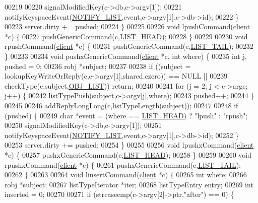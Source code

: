\begin{DoxyCode}
00219 
00220         signalModifiedKey(c->db,c->argv[1]);
00221         notifyKeyspaceEvent(\hyperlink{server_8h_a1c0b64c84b0e66dff3554ffe3e2ec4c8}{NOTIFY\_LIST},event,c->argv[1],c->db->id);
00222     \}
00223     server.dirty += pushed;
00224 \}
00225 
00226 \textcolor{keywordtype}{void} lpushCommand(\hyperlink{structclient}{client} *c) \{
00227     pushGenericCommand(c,\hyperlink{server_8h_a5fc6a15ca26c6208f66ad2768a3108ef}{LIST\_HEAD});
00228 \}
00229 
00230 \textcolor{keywordtype}{void} rpushCommand(\hyperlink{structclient}{client} *c) \{
00231     pushGenericCommand(c,\hyperlink{server_8h_a745de98bef5b645df56479181803235b}{LIST\_TAIL});
00232 \}
00233 
00234 \textcolor{keywordtype}{void} pushxGenericCommand(\hyperlink{structclient}{client} *c, \textcolor{keywordtype}{int} where) \{
00235     \textcolor{keywordtype}{int} j, pushed = 0;
00236     robj *subject;
00237 
00238     \textcolor{keywordflow}{if} ((subject = lookupKeyWriteOrReply(c,c->argv[1],shared.czero)) == NULL ||
00239         checkType(c,subject,\hyperlink{server_8h_a4a5f22a280949c97a0cb0d4213275126}{OBJ\_LIST})) \textcolor{keywordflow}{return};
00240 
00241     \textcolor{keywordflow}{for} (j = 2; j < c->argc; j++) \{
00242         listTypePush(subject,c->argv[j],where);
00243         pushed++;
00244     \}
00245 
00246     addReplyLongLong(c,listTypeLength(subject));
00247 
00248     \textcolor{keywordflow}{if} (pushed) \{
00249         \textcolor{keywordtype}{char} *event = (where == \hyperlink{server_8h_a5fc6a15ca26c6208f66ad2768a3108ef}{LIST\_HEAD}) ? \textcolor{stringliteral}{"lpush"} : \textcolor{stringliteral}{"rpush"};
00250         signalModifiedKey(c->db,c->argv[1]);
00251         notifyKeyspaceEvent(\hyperlink{server_8h_a1c0b64c84b0e66dff3554ffe3e2ec4c8}{NOTIFY\_LIST},event,c->argv[1],c->db->id);
00252     \}
00253     server.dirty += pushed;
00254 \}
00255 
00256 \textcolor{keywordtype}{void} lpushxCommand(\hyperlink{structclient}{client} *c) \{
00257     pushxGenericCommand(c,\hyperlink{server_8h_a5fc6a15ca26c6208f66ad2768a3108ef}{LIST\_HEAD});
00258 \}
00259 
00260 \textcolor{keywordtype}{void} rpushxCommand(\hyperlink{structclient}{client} *c) \{
00261     pushxGenericCommand(c,\hyperlink{server_8h_a745de98bef5b645df56479181803235b}{LIST\_TAIL});
00262 \}
00263 
00264 \textcolor{keywordtype}{void} linsertCommand(\hyperlink{structclient}{client} *c) \{
00265     \textcolor{keywordtype}{int} where;
00266     robj *subject;
00267     listTypeIterator *iter;
00268     listTypeEntry entry;
00269     \textcolor{keywordtype}{int} inserted = 0;
00270 
00271     \textcolor{keywordflow}{if} (strcasecmp(c->argv[2]->ptr,\textcolor{stringliteral}{"after"}) == 0) \{

\end{DoxyCode}

